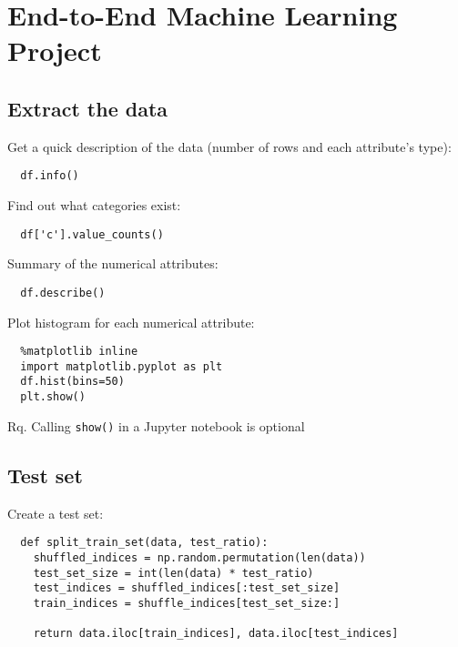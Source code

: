 \documentclass[french]{article}
\begin{document}
\section{End-to-End Machine Learning Project}

\subsection{Extract the data}

Get a quick description of the data (number of rows and each attribute's type):
\begin{lstlisting}
  df.info()
\end{lstlisting}

Find out what categories exist:
\begin{lstlisting}
  df['c'].value_counts()
\end{lstlisting}

Summary of the numerical attributes:
\begin{lstlisting}
  df.describe()
\end{lstlisting}

Plot histogram for each numerical attribute:
\begin{lstlisting}
  %matplotlib inline
  import matplotlib.pyplot as plt
  df.hist(bins=50)
  plt.show()
\end{lstlisting}
Rq. Calling \verb|show()| in a Jupyter notebook is optional


\subsection{Test set}

Create a test set:
\begin{lstlisting}
  def split_train_set(data, test_ratio):
    shuffled_indices = np.random.permutation(len(data))
    test_set_size = int(len(data) * test_ratio)
    test_indices = shuffled_indices[:test_set_size]
    train_indices = shuffle_indices[test_set_size:]

    return data.iloc[train_indices], data.iloc[test_indices]
\end{lstlisting}
\end{document}
